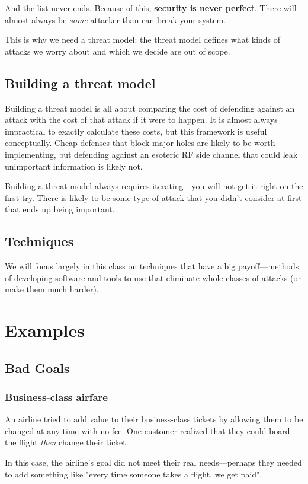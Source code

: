 And the list never ends. Because of this, \textbf{security is never perfect}. There will almost always be \textit{some} attacker than can break your system.

This is why we need a threat model: the threat model defines what kinds of attacks we worry about and which we decide are out of scope.

\subsection{Building a threat model}
Building a threat model is all about comparing the cost of defending against an attack with the cost of that attack if it were to happen. It is almost always impractical to exactly calculate these costs, but this framework is useful conceptually. Cheap defenses that block major holes are likely to be worth implementing, but defending against an esoteric RF side channel that could leak unimportant information is likely not.

Building a threat model always requires iterating---you will not get it right on the first try. There is likely to be some type of attack that you didn't consider at first that ends up being important.

\subsection{Techniques}
We will focus largely in this class on techniques that have a big payoff---methods of developing software and tools to use that eliminate whole classes of attacks (or make them much harder). 

\section{Examples}
\subsection{Bad Goals}
\subsubsection{Business-class airfare}
An airline tried to add value to their business-class tickets by allowing them to be changed at any time with no fee. One customer realized that they could board the flight \textit{then} change their ticket.

In this case, the airline's goal did not meet their real needs---perhaps they needed to add something like "every time someone takes a flight, we get paid".

